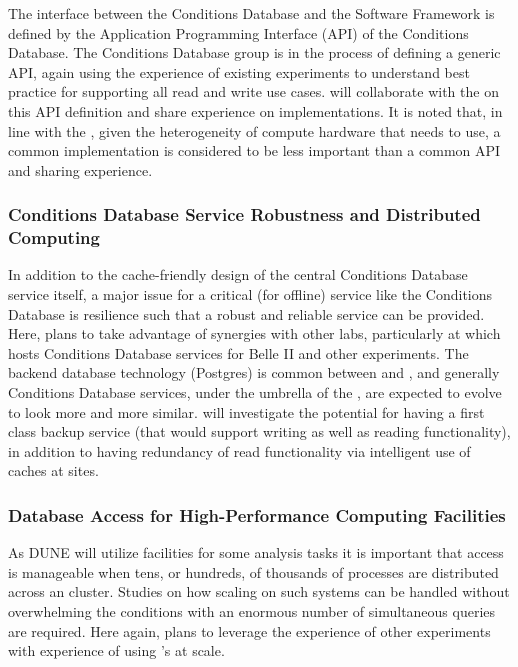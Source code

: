 \documentclass[../main-v1.tex]{subfiles}
\begin{document}
The interface between the Conditions Database and the Software Framework is defined by the Application Programming Interface (API) %
of the Conditions Database.  The  Conditions Database group is in the process of defining a generic API, again using the experience of existing  experiments to understand best practice for supporting all read and write use cases.   will collaborate with the  on this API definition and share experience on implementations.  It is noted that, in line with the , given the heterogeneity of compute hardware that  needs to use, a common implementation is considered to be less important than a common API and sharing experience.

\subsubsection{Conditions Database Service Robustness and Distributed Computing}

In addition to the cache-friendly design of the central Conditions Database service itself, a major issue for a critical (for offline) service like the Conditions Database is resilience such that a robust and reliable service can be provided.  Here,  plans to take advantage of synergies with other  labs, particularly at  which hosts Conditions Database services for Belle II and other experiments.  The backend database technology (Postgres) is common between  and , and generally Conditions Database services, under the umbrella of the , are expected to evolve to look more and more similar.   will investigate the potential for having a first class backup service (that would support writing as well as reading functionality), in addition to having redundancy of read functionality via intelligent use of caches at sites.


\subsubsection{Database Access for High-Performance Computing Facilities}

As DUNE will utilize    facilities for some analysis tasks it is important that  access is manageable when tens, or hundreds, of thousands of processes are distributed across an    cluster. Studies on how scaling on such systems can be handled without overwhelming the conditions  with an enormous number of simultaneous queries are required. %
Here again,  plans to leverage the experience of other  experiments with experience of using 's at scale.
\end{document}
